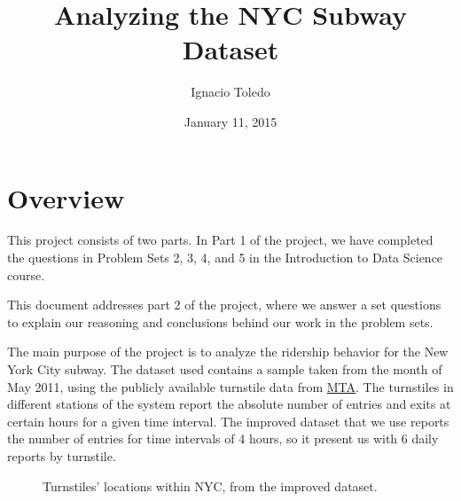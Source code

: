 \documentclass[a4paper,12pt,english]{sphinxmanual}
\title{Analyzing the NYC Subway Dataset}
\date{January 11, 2015}
\author{Ignacio Toledo}
\begin{document}
\maketitle
\tableofcontents
{}\label{index::doc}



\chapter{Overview}
\label{overview:overview}\label{overview::doc}\label{overview:analyzing-the-nyc-subway-dataset}
This project consists of two parts. In Part 1 of the project, we have completed
the questions in Problem Sets 2, 3, 4, and 5 in the Introduction to
Data Science course.

This document addresses part 2 of the project, where we answer a set questions
to explain our reasoning and conclusions behind our work in the problem sets.

The main purpose of the project is to analyze the ridership behavior for the
New York City subway. The dataset used contains a sample taken from the month
of May 2011, using the publicly available turnstile data from
\href{http://web.mta.info/developers/turnstile.html}{MTA}. The turnstiles in
different stations of the system report the absolute number of entries and exits
at certain hours for a given time interval. The improved dataset that we use
reports the number of entries for time intervals of 4 hours, so it present us
with 6 daily reports by turnstile.
\begin{figure}[htbp]
\centering
\capstart

\caption{Turnstiles' locations within NYC, from the improved dataset.}\end{figure}
\end{document}

